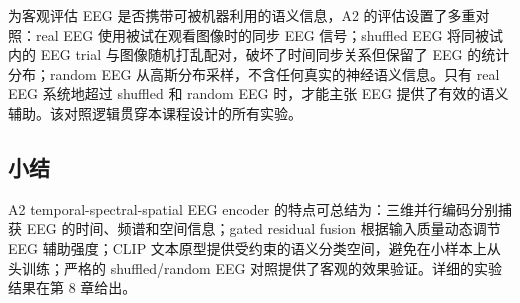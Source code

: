 为客观评估 EEG 是否携带可被机器利用的语义信息，A2 的评估设置了多重对照：real EEG 使用被试在观看图像时的同步 EEG 信号；shuffled EEG 将同被试内的 EEG trial 与图像随机打乱配对，破坏了时间同步关系但保留了 EEG 的统计分布；random EEG 从高斯分布采样，不含任何真实的神经语义信息。只有 real EEG 系统地超过 shuffled 和 random EEG 时，才能主张 EEG 提供了有效的语义辅助。该对照逻辑贯穿本课程设计的所有实验。

\subsection{小结}

A2 temporal-spectral-spatial EEG encoder 的特点可总结为：三维并行编码分别捕获 EEG 的时间、频谱和空间信息；gated residual fusion 根据输入质量动态调节 EEG 辅助强度；CLIP 文本原型提供受约束的语义分类空间，避免在小样本上从头训练；严格的 shuffled/random EEG 对照提供了客观的效果验证。详细的实验结果在第 8 章给出。

